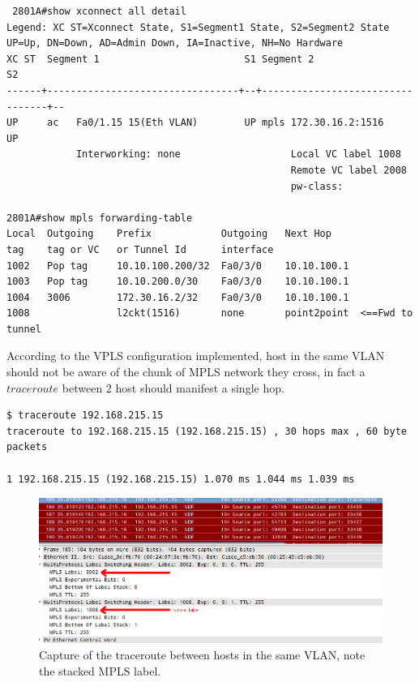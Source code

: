\documentclass{llncs}
\begin{document}
\lstset{language=sh, caption=Cisco 2801A (LER) configuration after VPLS set-up, basicstyle=\ttfamily\scriptsize , breaklines=true}
\begin{lstlisting}
 2801A#show xconnect all detail 
Legend: XC ST=Xconnect State, S1=Segment1 State, S2=Segment2 State
UP=Up, DN=Down, AD=Admin Down, IA=Inactive, NH=No Hardware
XC ST  Segment 1                         S1 Segment 2                         S2
------+---------------------------------+--+---------------------------------+--
UP     ac   Fa0/1.15 15(Eth VLAN)        UP mpls 172.30.16.2:1516             UP
            Interworking: none                   Local VC label 1008            
                                                 Remote VC label 2008           
                                                 pw-class:          
                                                             
2801A#show mpls forwarding-table 
Local  Outgoing    Prefix            Outgoing   Next Hop    
tag    tag or VC   or Tunnel Id      interface              
1002   Pop tag     10.10.100.200/32  Fa0/3/0    10.10.100.1  
1003   Pop tag     10.10.200.0/30    Fa0/3/0    10.10.100.1  
1004   3006        172.30.16.2/32    Fa0/3/0    10.10.100.1  
1008               l2ckt(1516)       none       point2point  <==Fwd to tunnel
\end{lstlisting}

According to the VPLS configuration implemented, host in the same VLAN should not be aware of the chunk of MPLS network they cross, in fact a $traceroute$ between 2 host should manifest a single hop.\\

\lstset{language=sh, caption=Traceroute from hosts in the same VLAN, basicstyle=\ttfamily\scriptsize , breaklines=true}

\begin{lstlisting}
$ traceroute 192.168.215.15
traceroute to 192.168.215.15 (192.168.215.15) , 30 hops max , 60 byte packets

1 192.168.215.15 (192.168.215.15) 1.070 ms 1.044 ms 1.039 ms
\end{lstlisting}

\begin{figure}
\centering
\includegraphics[width=1.0\textwidth]{../e4/traceroute_vpls.png}
\caption{Capture of the traceroute between hosts in the same VLAN, note the stacked MPLS label.}
\label{fig:mpls2_traceroute_vpls}
\end{figure}
\end{document}
